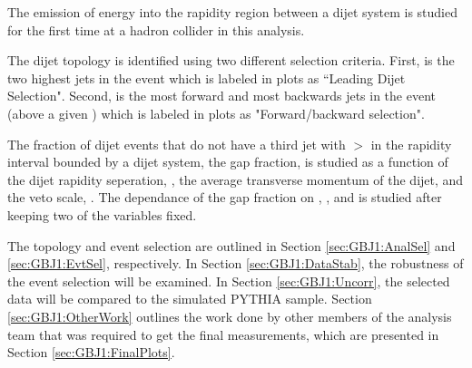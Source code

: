 The emission of energy into the rapidity region between a dijet system is studied for the first time at a hadron collider in this analysis.

The dijet topology is identified using two different selection criteria. First, is the two highest \pt{} jets in the event which is labeled in plots as ``Leading \pt{} Dijet Selection". Second, is the most forward and most backwards jets in the event (above a given \pt{}) which is labeled in plots as "Forward/backward selection".


The fraction of dijet events that do not have a third jet with \pt{}$>$\qz{} in the rapidity interval bounded by a dijet system, the gap fraction, is studied as a function of the dijet rapidity seperation, \dy{}, the average transverse momentum of the dijet, \ptb{} and the veto scale, \qz{}.
The dependance of the gap fraction on \dy{}, \ptb{}, and \qz{} is studied after keeping two of the variables fixed.

The topology and event selection are outlined in Section \ref{sec:GBJ1:AnalSel} and \ref{sec:GBJ1:EvtSel}, respectively. 
In Section \ref{sec:GBJ1:DataStab}, the robustness of the event selection will be examined. 
In Section \ref{sec:GBJ1:Uncorr}, the selected data will be compared to the simulated PYTHIA sample.
Section \ref{sec:GBJ1:OtherWork} outlines the work done by other members of the analysis team that was required to get the final measurements, which are presented in Section \ref{sec:GBJ1:FinalPlots}. 

 


%
